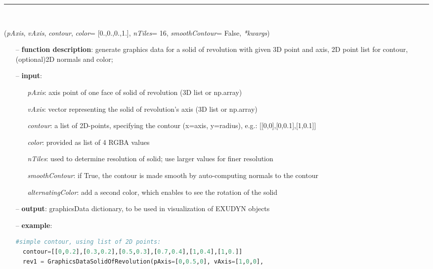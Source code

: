 \begin{itemize}[leftmargin=1.4cm]
\begin{itemize}[leftmargin=1.4cm]
\begin{itemize}[leftmargin=0.5cm]
\begin{itemize}[leftmargin=1.4cm]
\begin{itemize}[leftmargin=1.4cm]
\begin{itemize}[leftmargin=0.5cm]
\begin{itemize}[leftmargin=1.4cm]
\begin{itemize}[leftmargin=0.5cm]
%
\noindent\rule{8cm}{0.75pt}\vspace{1pt} \\ 
\begin{flushleft}
\label{sec:graphicsDataUtilities:GraphicsDataSolidOfRevolution}
({\it pAxis}, {\it vAxis}, {\it contour}, {\it color}= [0.,0.,0.,1.], {\it nTiles}= 16, {\it smoothContour}= False, {\it **kwargs})
\end{flushleft}
\setlength{\itemindent}{0.7cm}
\begin{itemize}[leftmargin=0.7cm]
\item[--]{\bf function description}: generate graphics data for a solid of revolution with given 3D point and axis, 2D point list for contour, (optional)2D normals and color;
\item[--]{\bf input}: \vspace{-6pt}
\begin{itemize}[leftmargin=1.2cm]
\setlength{\itemindent}{-0.7cm}
\item[]{\it pAxis}: axis point of one face of solid of revolution (3D list or np.array)
\item[]{\it vAxis}: vector representing the solid of revolution's axis (3D list or np.array)
\item[]{\it contour}: a list of 2D-points, specifying the contour (x=axis, y=radius), e.g.: [[0,0],[0,0.1],[1,0.1]]
\item[]{\it color}: provided as list of 4 RGBA values
\item[]{\it nTiles}: used to determine resolution of solid; use larger values for finer resolution
\item[]{\it smoothContour}: if True, the contour is made smooth by auto-computing normals to the contour
\item[]{\it alternatingColor}: add a second color, which enables to see the rotation of the solid
\end{itemize}
\item[--]{\bf output}: graphicsData dictionary, to be used in visualization of EXUDYN objects
\item[--]{\bf example}: \vspace{-12pt}\ei\begin{lstlisting}[language=Python, xleftmargin=36pt]
  #simple contour, using list of 2D points:
  contour=[[0,0.2],[0.3,0.2],[0.5,0.3],[0.7,0.4],[1,0.4],[1,0.]]
  rev1 = GraphicsDataSolidOfRevolution(pAxis=[0,0.5,0], vAxis=[1,0,0],

\end{lstlisting}
\end{itemize}
\end{itemize}
\end{itemize}
\end{itemize}
\end{itemize}
\end{itemize}
\end{itemize}
\end{itemize}
\end{itemize}
